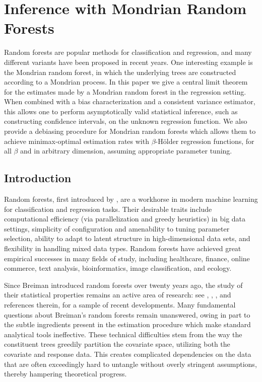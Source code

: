 
\chapter{Inference with Mondrian Random Forests}
\label{ch:mondrian}

Random forests are popular methods for classification and regression, and many
different variants have been proposed in recent years. One interesting example
is the Mondrian random forest, in which the underlying trees are constructed
according to a Mondrian process. In this paper we give a central limit theorem
for the estimates made by a Mondrian random forest in the regression setting.
When combined with a bias characterization and a consistent variance estimator,
this allows one to perform asymptotically valid statistical inference, such as
constructing confidence intervals, on the unknown regression function. We also
provide a debiasing procedure for Mondrian random forests which allows them to
achieve minimax-optimal estimation rates with $\beta$-H{\"o}lder regression
functions, for all $\beta$ and in arbitrary dimension, assuming appropriate
parameter tuning.

\section{Introduction}

Random forests, first introduced by \citet{breiman2001random},
are a workhorse in modern machine learning
for classification and regression tasks.
Their desirable traits include computational efficiency
(via parallelization and greedy heuristics)
in big data settings, simplicity of configuration and
amenability to tuning parameter selection, ability to
adapt to latent structure in high-dimensional data sets, and flexibility in
handling mixed data types.
Random forests have achieved great empirical successes in many
fields of study, including
healthcare, finance, online commerce,
text analysis, bioinformatics, image classification, and ecology.

Since Breiman introduced random forests over twenty years ago, the study of
their statistical properties remains an active area of research:
see \citet{Scornet-Biau-Vert_2015_AOS}, \citet{Chi-Vossler-Fan-Lv_2022_AOS},
\citet{klusowski2021universal}, and references therein, for a sample of recent
developments. Many fundamental questions about Breiman's random forests
remain unanswered, owing in part to the subtle ingredients
present in the estimation procedure which
make standard analytical tools ineffective.
These technical difficulties stem from the way the constituent trees greedily
partition the covariate space, utilizing both the covariate and response
data. This creates complicated dependencies on the data that are often
exceedingly hard to untangle without overly stringent assumptions, thereby
hampering theoretical progress.

